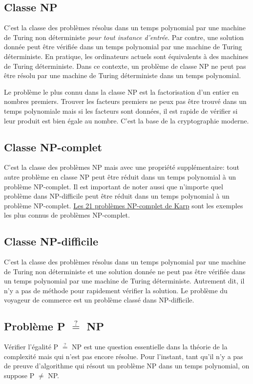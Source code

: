 \documentclass[../main.tex]{subfiles}
\begin{document}
\subsection{Classe NP}
C'est la classe des problèmes résolus dans un temps polynomial par une machine de Turing non déterministe \emph{pour tout instance d'entrée}. Par contre, une solution donnée peut être vérifiée dans un temps polynomial par une machine de Turing déterministe. En pratique, les ordinateurs actuels sont équivalents à des machines de Turing déterministe. Dans ce contexte, un problème de classe NP ne peut pas être résolu par une machine de Turing déterministe dans un temps polynomial.

Le problème le plus connu dans la classe NP est la factorisation d'un entier en nombres premiers. Trouver les facteurs premiers ne peux pas être trouvé dans un temps polynomiale mais si les facteurs sont données, il est rapide de vérifier si leur produit est bien égale au nombre. C'est la base de la cryptographie moderne.

\subsection{Classe NP-complet}
C'est la classe des problèmes NP mais avec une propriété supplémentaire: tout autre problème en classe NP peut être réduit dans un temps polynomial à un problème NP-complet. Il est important de noter aussi que n'importe quel problème dans NP-difficile peut être réduit dans un temps polynomial à un problème NP-complet. \href{https://fr.wikipedia.org/wiki/21_probl\%C3\%A8mes_NP-complets_de_Karp}{Les 21 problèmes NP-complet de Karp} sont les exemples les plus connus de problèmes NP-complet.

\subsection{Classe NP-difficile}
C'est la classe des problèmes résolus dans un temps polynomial par une machine de Turing non déterministe et une solution donnée ne peut pas être vérifiée dans un temps polynomial par une machine de Turing déterministe. Autrement dit, il n'y a pas de méthode pour rapidement vérifier la solution. Le problème du voyageur de commerce est un problème classé dans NP-difficile.

\subsection{Problème P $\stackrel{?}{=}$ NP}

Vérifier l'égalité P $\stackrel{?}{=}$ NP est une question essentielle dans la théorie de la complexité mais qui n'est pas encore résolue. Pour l'instant, tant qu'il n'y a pas de preuve d'algorithme qui résout un problème NP dans un temps polynomial, on suppose P $\neq$ NP.
\end{document}
